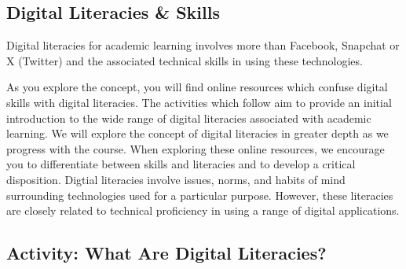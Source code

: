\documentclass[
]{book}
\theoremstyle{definition}
\theoremstyle{definition}
\theoremstyle{definition}
\theoremstyle{definition}
\theoremstyle{remark}
\begin{document}
\hypertarget{digital-literacies-skills}{%
\subsection*{Digital Literacies \& Skills}\label{digital-literacies-skills}}

Digital literacies for academic learning involves more than Facebook, Snapchat or X (Twitter) and the associated technical skills in using these technologies.

As you explore the concept, you will find online resources which confuse digital skills with digital literacies. The activities which follow aim to provide an initial introduction to the wide range of digital literacies associated with academic learning. We will explore the concept of digital literacies in greater depth as we progress with the course. When exploring these online resources, we encourage you to differentiate between skills and literacies and to develop a critical disposition. Digtial literacies involve issues, norms, and habits of mind surrounding technologies used for a particular purpose. However, these literacies are closely related to technical proficiency in using a range of digital applications.

\hypertarget{activity-what-are-digital-literacies}{%
\subsection*{Activity: What Are Digital Literacies?}\label{activity-what-are-digital-literacies}}
\end{document}
